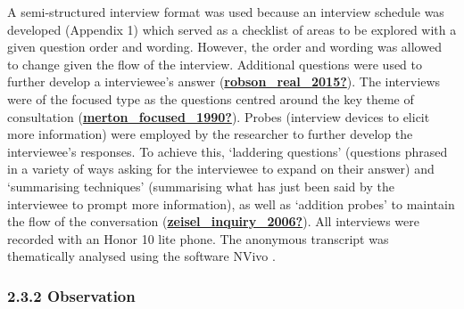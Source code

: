 \documentclass[
]{article}
\begin{document}
A semi-structured interview format was used because an interview
schedule was developed (Appendix 1) which served as a checklist of areas
to be explored with a given question order and wording. However, the
order and wording was allowed to change given the flow of the interview.
Additional questions were used to further develop a interviewee's answer
(\protect\hyperlink{ref-robson_real_2015}{\textbf{robson\_real\_2015?}}).
The interviews were of the focused type as the questions centred around
the key theme of consultation
(\protect\hyperlink{ref-merton_focused_1990}{\textbf{merton\_focused\_1990?}}).
Probes (interview devices to elicit more information) were employed by
the researcher to further develop the interviewee's responses. To
achieve this, `laddering questions' (questions phrased in a variety of
ways asking for the interviewee to expand on their answer) and
`summarising techniques' (summarising what has just been said by the
interviewee to prompt more information), as well as `addition probes' to
maintain the flow of the conversation
(\protect\hyperlink{ref-zeisel_inquiry_2006}{\textbf{zeisel\_inquiry\_2006?}}).
All interviews were recorded with an Honor 10 lite phone. The anonymous
transcript was thematically analysed using the software NVivo .

\hypertarget{observation}{%
\subsubsection{2.3.2 Observation}\label{observation}}
\end{document}

